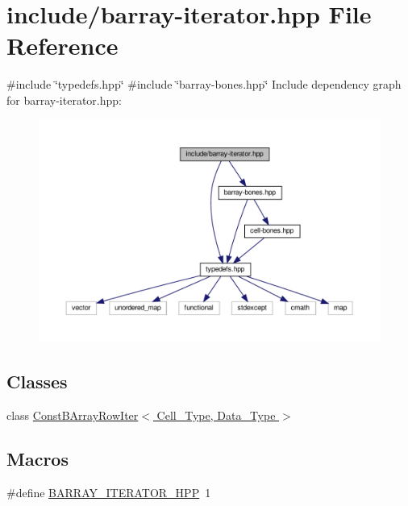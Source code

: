 \hypertarget{barray-iterator_8hpp}{}\section{include/barray-\/iterator.hpp File Reference}
\label{barray-iterator_8hpp}
{\ttfamily \#include \char`\"{}typedefs.\+hpp\char`\"{}}\newline
{\ttfamily \#include \char`\"{}barray-\/bones.\+hpp\char`\"{}}\newline
Include dependency graph for barray-\/iterator.hpp\+:
\nopagebreak
\begin{figure}[H]
\begin{center}
\leavevmode
\includegraphics[width=350pt]{barray-iterator_8hpp__incl}
\end{center}
\end{figure}
\subsection*{Classes}
\begin{DoxyCompactItemize}
\item 
class \hyperlink{class_const_b_array_row_iter}{Const\+B\+Array\+Row\+Iter$<$ Cell\+\_\+\+Type, Data\+\_\+\+Type $>$}
\end{DoxyCompactItemize}
\subsection*{Macros}
\begin{DoxyCompactItemize}
\item 
\#define \hyperlink{barray-iterator_8hpp_af7d28058e98dd1797def3cd230abe121}{B\+A\+R\+R\+A\+Y\+\_\+\+I\+T\+E\+R\+A\+T\+O\+R\+\_\+\+H\+PP}~1
\end{DoxyCompactItemize}



